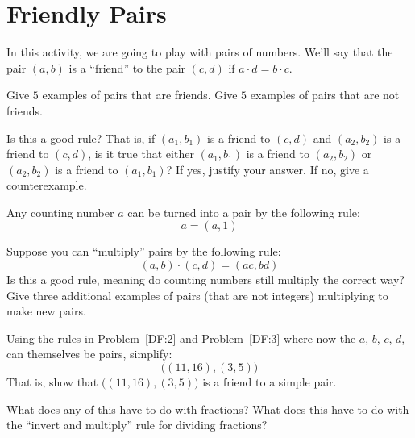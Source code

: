\newpage
\section{Friendly Pairs}

In this activity, we are going to play with pairs of numbers.  We'll
say that the pair $(a,b)$ is a ``friend'' to the pair $(c,d)$ if
$a\cdot d = b\cdot c$.

\begin{prob}
Give $5$ examples of pairs that are friends. Give $5$ examples of
pairs that are not friends.
\end{prob}

\begin{prob}\label{DF:2}
Is this a good rule?  That is, if $(a_1,b_1)$ is a friend to $(c,d)$
and $(a_2,b_2)$ is a friend to $(c,d)$, is it true that either
$(a_1,b_1)$ is a friend to $(a_2,b_2)$ or $(a_2,b_2)$ is a friend to
$(a_1,b_1)$?  If yes, justify your answer.  If no, give a
counterexample.
\end{prob}


Any counting number $a$ can be turned into a pair by the following
rule:
\[
a = (a,1)
\]

\begin{prob}\label{DF:3}
Suppose you can ``multiply'' pairs by the following rule:
\[
(a,b)\cdot (c,d) = (ac,bd)
\]
Is this a good rule, meaning do counting numbers still multiply the
correct way? Give three additional examples of pairs (that are not
integers) multiplying to make new pairs.
\end{prob}

\begin{prob}
Using the rules in Problem~\ref{DF:2} and Problem~\ref{DF:3} where now
the $a$, $b$, $c$, $d$, can themselves be pairs, simplify:
\[
\big((11,16),(3,5)\big)
\]
That is, show that $\big((11,16),(3,5)\big)$ is a friend to a simple
pair.
\end{prob}

\begin{prob}
What does any of this have to do with fractions? What does this have
to do with the ``invert and multiply'' rule for dividing fractions?
\end{prob}
